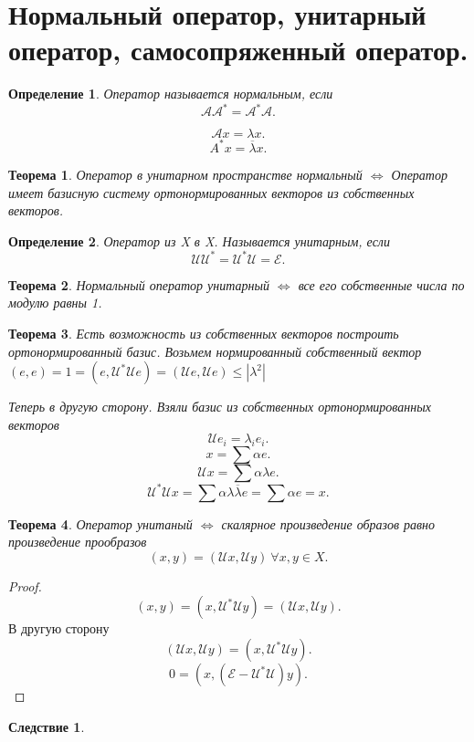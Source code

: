 \documentclass{scrartcl}
\newtheorem{theorem}{Теорема}
\newtheorem{definition}{Определение}
\newtheorem{corollary}{Следствие}[theorem]
\begin{document}
\section{Нормальный оператор, унитарный оператор, самосопряженный оператор.}
\begin{definition}
    Оператор называется нормальным, если
    \[
        \mathcal{A} \mathcal{A}^{*} = \mathcal{A}^{*} \mathcal{A}
    .\] 
\end{definition}
\[
    \mathcal{A}x = \lambda x
.\] 
\[
A^{*}x = \overline{\lambda} x
.\] 
\begin{theorem}
    Оператор в унитарном пространстве нормальный $\iff$
    Оператор имеет базисную систему ортонормированных векторов из собственных векторов. 
\end{theorem}
\begin{definition}
    Оператор из X  в X. Называется унитарным, если
    \[
        \mathcal{U} \mathcal{U}^{*} = \mathcal{U}^{*} \mathcal{U} = \mathcal{E}
    .\] 
\end{definition}
\begin{theorem}
    Нормальный оператор унитарный $\iff$ все его собственные числа по модулю равны 1.
\end{theorem}
\begin{theorem}
    Есть возможность из собственных векторов построить ортонормированный базис.
    Возьмем нормированный собственный вектор $(e,e) = 1 = (e,\mathcal{U}^{*} \mathcal{U} e) = (\mathcal{U} e,\mathcal{U} e) \le  |\lambda^{2}|$

    Теперь в другую сторону. Взяли базис из собственных ортонормированных векторов
    \[
        \mathcal{U} e_{i} = \lambda_{i}e_{i}
    .\] 
    \[
    x = \sum \alpha e
    .\] 
    \[
        \mathcal{U} x = \sum \alpha \lambda e
    .\] 
    \[
        \mathcal{U}^{*} \mathcal{U} x = \sum \alpha \lambda \overline{\lambda} e =
        \sum \alpha e = x
    .\] 
\end{theorem}
\begin{theorem}
    Оператор унитаный $\iff$ скалярное произведение образов равно произведение прообразов
     \[
         (x,y) =  (\mathcal{U} x, \mathcal{U} y) ~\forall x,y \in X
    .\] 
\end{theorem}
\begin{proof}
    \[
        (x,y) = (x,\mathcal{U}^{*} \mathcal{U} y) = (\mathcal{U} x,\mathcal{U} y)
    .\] 
    В другую сторону
    \[
        (\mathcal{U} x, \mathcal{U} y) = (x,\mathcal{U}^{*} \mathcal{U} y)
    .\] 
    \[
        0 = (x, (\mathcal{E} - \mathcal{U}^{*}\mathcal{U})y)
    .\] 
\end{proof}
\begin{corollary}
    
\end{corollary}
\end{document}
